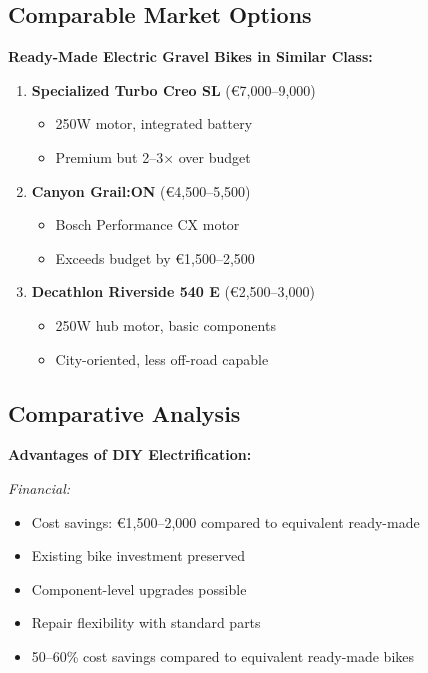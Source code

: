 \documentclass[12pt,a4paper]{article}
\begin{document}
\subsection{Comparable Market Options}

\textbf{Ready-Made Electric Gravel Bikes in Similar Class:}

\begin{enumerate}
    \item \textbf{Specialized Turbo Creo SL} (€7,000--9,000) \cite{specialized-turbo}
    \begin{itemize}
        \item 250W motor, integrated battery
        \item Premium but 2--3× over budget
    \end{itemize}
    
    \item \textbf{Canyon Grail:ON} (€4,500--5,500) \cite{canyon-grail}
    \begin{itemize}
        \item Bosch Performance CX motor
        \item Exceeds budget by €1,500--2,500
    \end{itemize}
    
    \item \textbf{Decathlon Riverside 540 E} (€2,500--3,000) \cite{decathlon-riverside}
    \begin{itemize}
        \item 250W hub motor, basic components
        \item City-oriented, less off-road capable
    \end{itemize}
\end{enumerate}

\subsection{Comparative Analysis}

\textbf{Advantages of DIY Electrification:}

\textit{Financial:}
\begin{itemize}
    \item Cost savings: €1,500--2,000 compared to equivalent ready-made
    \item Existing bike investment preserved
    \item Component-level upgrades possible
    \item Repair flexibility with standard parts
    \item 50--60\% cost savings compared to equivalent ready-made bikes
\end{itemize}
\end{document}
